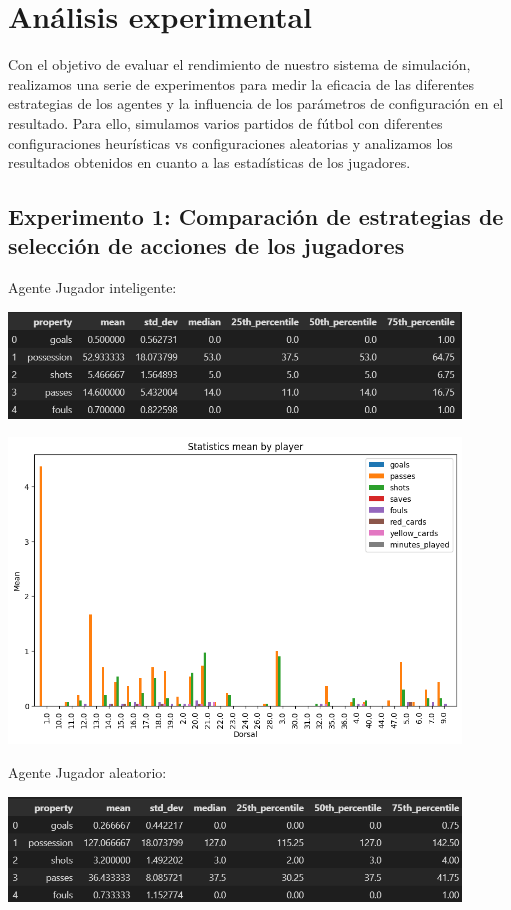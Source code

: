 \documentclass{article}
\begin{document}
\section{Análisis experimental}

Con el objetivo de evaluar el rendimiento de nuestro sistema de simulación, realizamos una serie de experimentos para medir
la eficacia de las diferentes estrategias de los agentes y la influencia de los parámetros de configuración en el resultado.
Para ello, simulamos varios partidos de fútbol con diferentes configuraciones heurísticas vs configuraciones 
aleatorias y analizamos los resultados obtenidos en cuanto a las estadísticas de los jugadores.

\subsection{Experimento 1: Comparación de estrategias de selección de acciones de los jugadores}
Agente Jugador inteligente:

\includegraphics[width=0.9\textwidth]{images/tabla1.PNG}

\includegraphics[width=0.9\textwidth,height=0.5\textwidth]{images/smart_vs_random_player_home.png}

Agente Jugador aleatorio:

\includegraphics[width=0.9\textwidth]{images/tabla2.PNG}
\end{document}
